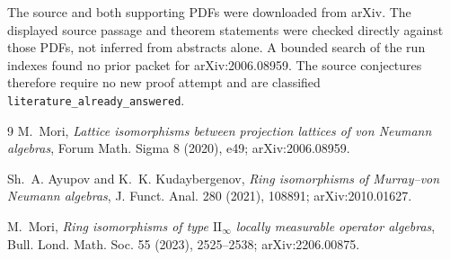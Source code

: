 \documentclass[11pt]{article}
\begin{document}
The source and both supporting PDFs were downloaded from arXiv.  The
displayed source passage and theorem statements were checked directly
against those PDFs, not inferred from abstracts alone.  A bounded search of
the run indexes found no prior packet for arXiv:2006.08959.  The source
conjectures therefore require no new proof attempt and are classified
\texttt{literature\_already\_answered}.

\begin{thebibliography}{9}
M.~Mori,
\emph{Lattice isomorphisms between projection lattices of von Neumann algebras},
Forum Math. Sigma 8 (2020), e49; arXiv:2006.08959.

Sh.~A. Ayupov and K.~K. Kudaybergenov,
\emph{Ring isomorphisms of Murray--von Neumann algebras},
J. Funct. Anal. 280 (2021), 108891; arXiv:2010.01627.

M.~Mori,
\emph{Ring isomorphisms of type \(\mathrm{II}_\infty\) locally measurable
operator algebras},
Bull. Lond. Math. Soc. 55 (2023), 2525--2538; arXiv:2206.00875.
\end{thebibliography}
\end{document}
